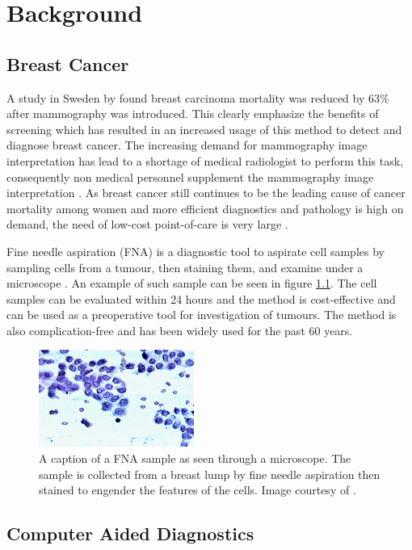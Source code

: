 \chapter{Background}


\section{Breast Cancer}

A study in Sweden by \textcite{tabar2001} found breast carcinoma mortality was reduced by 63\% after mammography was introduced. This clearly emphasize the benefits of screening which has resulted in an increased usage of this method to detect and diagnose breast cancer. The increasing demand for mammography image interpretation has lead to a shortage of medical radiologist to perform this task, consequently non medical personnel supplement the mammography image interpretation \parencite{culpan2016}. As breast cancer still continues to be the leading cause of cancer mortality among women and more efficient diagnostics and pathology is high on demand, the need of low-cost point-of-care is very large \parencite{martei2018}.

Fine needle aspiration (FNA) is a diagnostic tool to aspirate cell samples by sampling cells from a tumour, then staining them, and examine under a microscope \parencite{FNA}. An example of such sample can be seen in figure \ref{fig:fna_nuclei}. The cell samples can be evaluated within 24 hours and the method is cost-effective and can be used as a preoperative tool for investigation of tumours. The method is also complication-free and has been widely used for the past 60 years.

\begin{figure}[ht!]
  \centering
  \includegraphics[]{images/fna_nuclei.png}
  \caption[]
  {\small A caption of a FNA sample as seen through a microscope. The sample is collected from a breast lump by fine needle aspiration then stained to engender the features of the cells. Image courtesy of \textcite{dua:2017}.}
  \label{fig:fna_nuclei}
\end{figure}


\section{Computer Aided Diagnostics}

